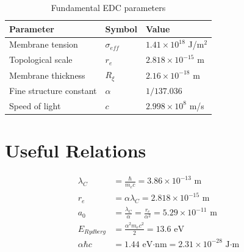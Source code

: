 \documentclass[12pt,a4paper]{article}
\begin{document}
\begin{table}[h]
\centering
\begin{tabular}{@{}lll@{}}
\toprule
\textbf{Parameter} & \textbf{Symbol} & \textbf{Value} \\
\midrule
Membrane tension & $\sigma_{eff}$ & $1.41 \times 10^{18}$ J/m$^2$ \\
Topological scale & $r_e$ & $2.818 \times 10^{-15}$ m \\
Membrane thickness & $R_\xi$ & $2.16 \times 10^{-18}$ m \\
Fine structure constant & $\alpha$ & $1/137.036$ \\
Speed of light & $c$ & $2.998 \times 10^{8}$ m/s \\
\bottomrule
\end{tabular}
\caption{Fundamental EDC parameters}
\end{table}

\section{Useful Relations}

\begin{align}
\lambda_C &= \frac{\hbar}{m_e c} = 3.86 \times 10^{-13} \text{ m} \\
r_e &= \alpha \lambda_C = 2.818 \times 10^{-15} \text{ m} \\
a_0 &= \frac{\lambda_C}{\alpha} = \frac{r_e}{\alpha^2} = 5.29 \times 10^{-11} \text{ m} \\
E_{Rydberg} &= \frac{\alpha^2 m_e c^2}{2} = 13.6 \text{ eV} \\
\alpha \hbar c &= 1.44 \text{ eV·nm} = 2.31 \times 10^{-28} \text{ J·m}
\end{align}
\end{document}
